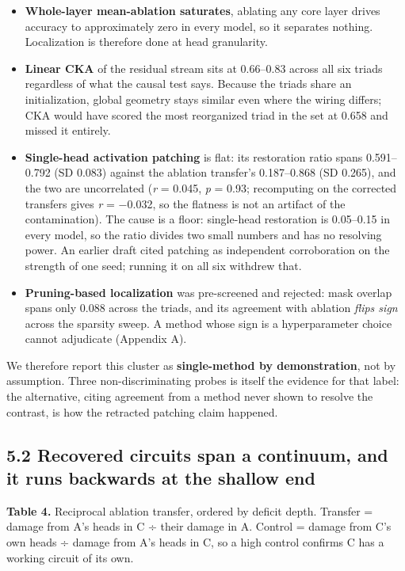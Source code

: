 \documentclass[11pt]{article}
\providecommand{\tightlist}{\setlength{\itemsep}{0pt}\setlength{\parskip}{0pt}}
\begin{document}
\begin{itemize}
\tightlist
\item
  \textbf{Whole-layer mean-ablation saturates}, ablating any core layer drives accuracy to
  approximately zero in every model, so it separates nothing. Localization is therefore done
  at head granularity.
\item
  \textbf{Linear CKA} of the residual stream sits at 0.66--0.83 across all six triads regardless of
  what the causal test says. Because the triads share an initialization, global geometry
  stays similar even where the wiring differs; CKA would have scored the most reorganized
  triad in the set at 0.658 and missed it entirely.
\item
  \textbf{Single-head activation patching} is flat: its restoration ratio spans 0.591--0.792
  (SD 0.083) against the ablation transfer's 0.187--0.868 (SD 0.265), and the two are
  uncorrelated (\emph{r} = 0.045, \emph{p} = 0.93; recomputing on the corrected transfers gives
  \emph{r} = −0.032, so the flatness is not an artifact of the contamination). The cause is a
  floor: single-head restoration is 0.05--0.15 in every model, so the ratio divides two small
  numbers and has no resolving power. An earlier draft cited patching as independent
  corroboration on the strength of one seed; running it on all six withdrew that.
\item
  \textbf{Pruning-based localization} was pre-screened and rejected: mask overlap spans only 0.088
  across the triads, and its agreement with ablation \emph{flips sign} across the sparsity sweep.
  A method whose sign is a hyperparameter choice cannot adjudicate (Appendix A).
\end{itemize}

We therefore report this cluster as \textbf{single-method by demonstration}, not by assumption.
Three non-discriminating probes is itself the evidence for that label: the alternative,
citing agreement from a method never shown to resolve the contrast, is how the retracted
patching claim happened.

\subsection{5.2 Recovered circuits span a continuum, and it runs backwards at the shallow end}\label{recovered-circuits-span-a-continuum-and-it-runs-backwards-at-the-shallow-end}

\textbf{Table 4.} Reciprocal ablation transfer, ordered by deficit depth. Transfer = damage from
A's heads in C ÷ their damage in A. Control = damage from C's own heads ÷ damage from A's
heads in C, so a high control confirms C has a working circuit of its own.
\end{document}
